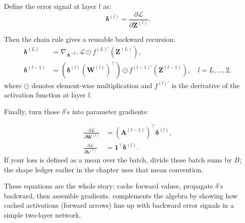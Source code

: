 Define the error signal at layer \(l\) as:
\[
\boldsymbol{\delta}^{(l)} = \frac{\partial \mathcal{L}}{\partial \mathbf{Z}^{(l)}}.
\]

Then the chain rule gives a reusable backward recursion:
\begin{equation}
\begin{aligned}
    \boldsymbol{\delta}^{(L)} &= \nabla_{\mathbf{A}^{(L)}} \mathcal{L} \odot f^{(L)\prime}(\mathbf{Z}^{(L)}), \\
    \boldsymbol{\delta}^{(l-1)} &= \left(\boldsymbol{\delta}^{(l)}(\mathbf{W}^{(l)})^\top\right) \odot f^{(l-1)\prime}(\mathbf{Z}^{(l-1)}), \quad l = L, \ldots, 2,
\end{aligned}
\label{eq:backprop_delta_recursion}
\end{equation}
where \(\odot\) denotes element-wise multiplication and \(f^{(l)\prime}\) is the derivative of the activation function at layer \( l \).

Finally, turn those \(\delta\)'s into parameter gradients:

\begin{equation}
    \begin{aligned}
        \frac{\partial \mathcal{L}}{\partial \mathbf{W}^{(l)}} &= (\mathbf{A}^{(l-1)})^\top \boldsymbol{\delta}^{(l)},\\
        \frac{\partial \mathcal{L}}{\partial \mathbf{b}^{(l)}} &= \mathbf{1}^\top \boldsymbol{\delta}^{(l)}.
    \end{aligned}
    \label{eq:backprop_param_grads}
\end{equation}
If your loss is defined as a mean over the batch, divide these batch sums by \(B\); the shape ledger earlier in the chapter uses that mean convention.

These equations are the whole story: cache forward values, propagate \(\delta\)'s backward, then assemble gradients.  complements the algebra by showing how cached activations (forward arrows) line up with backward error signals in a simple two-layer network.

\clearpage

